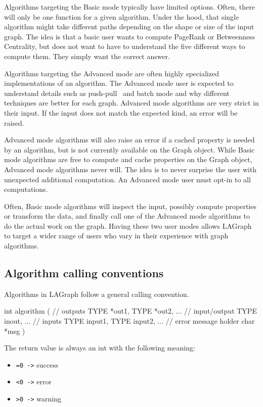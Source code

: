 Algorithms targeting the Basic mode typically have limited options. Often, there will only be one function for
a given algorithm. Under the hood, that single algorithm might take different paths depending on the shape or
size of the input graph. The idea is that a basic user wants to compute PageRank or Betweenness Centrality,
but does not want to have to understand the five different ways to compute them. They simply want the correct answer.

Algorithms targeting the Advanced mode are often highly specialized implementations of an algorithm. The Advanced
mode user is expected to understand details such as push-pull~\cite{DBLP:conf/icpp/YangBO18} and batch mode and why different techniques are
better for each graph. Advanced mode algorithms are very strict in their input. If the input does not match the
expected kind, an error will be raised.

Advanced mode algorithms will also raise an error if a cached property is needed by an algorithm, but is not
currently available on the Graph object. While Basic mode algorithms are free to compute and cache properties
on the Graph object, Advanced mode algorithms never will. The idea is to never surprise the user with unexpected
additional computation. An Advanced mode user must opt-in to all computations.

Often, Basic mode algorithms will inspect the input, possibly compute properties or transform the data,
and finally call one of the Advanced mode algorithms to do the actual work on the graph. Having these two user
modes allows LAGraph to target a wider range of users who vary in their experience with graph algorithms.


\subsection{Algorithm calling conventions}

Algorithms in LAGraph follow a general calling convention.

\begin{cplus}
int algorithm
(
    // outputs
    TYPE *out1,
    TYPE *out2,
    ...
    // input/output
    TYPE inout,
    ...
    // inputs
    TYPE input1,
    TYPE input2,
    ...
    // error message holder
    char *msg
)
\end{cplus}

The return value is always an int with the following meaning:

\begin{itemize}
    \item \verb'=0 ->' success
    \item \verb'<0 ->' error
    \item \verb'>0 ->' warning
\end{itemize}

